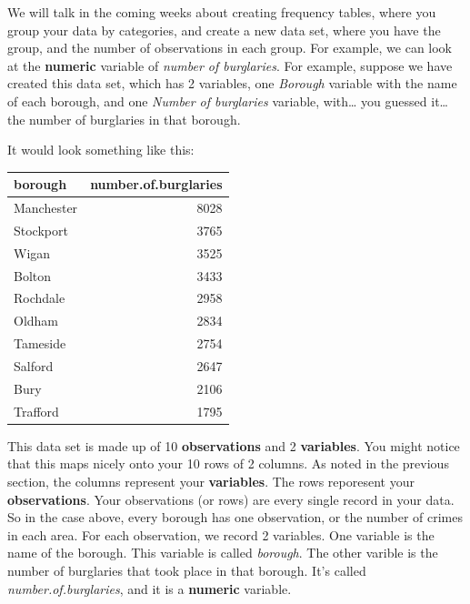 \documentclass[]{book}
\theoremstyle{definition}
\theoremstyle{definition}
\theoremstyle{definition}
\theoremstyle{remark}
\begin{document}
We will talk in the coming weeks about creating frequency tables, where
you group your data by categories, and create a new data set, where you
have the group, and the number of observations in each group. For
example, we can look at the \textbf{numeric} variable of \emph{number of
burglaries}. For example, suppose we have created this data set, which
has 2 variables, one \emph{Borough} variable with the name of each
borough, and one \emph{Number of burglaries} variable, with\ldots{} you
guessed it\ldots{} the number of burglaries in that borough.

It would look something like this:

\begin{tabular}{l|r}
\hline
borough & number.of.burglaries\\
\hline
Manchester & 8028\\
\hline
Stockport & 3765\\
\hline
Wigan & 3525\\
\hline
Bolton & 3433\\
\hline
Rochdale & 2958\\
\hline
Oldham & 2834\\
\hline
Tameside & 2754\\
\hline
Salford & 2647\\
\hline
Bury & 2106\\
\hline
Trafford & 1795\\
\hline
\end{tabular}

This data set is made up of 10 \textbf{observations} and 2
\textbf{variables}. You might notice that this maps nicely onto your 10
rows of 2 columns. As noted in the previous section, the columns
represent your \textbf{variables}. The rows reporesent your
\textbf{observations}. Your observations (or rows) are every single
record in your data. So in the case above, every borough has one
observation, or the number of crimes in each area. For each observation,
we record 2 variables. One variable is the name of the borough. This
variable is called \emph{borough}. The other varible is the number of
burglaries that took place in that borough. It's called
\emph{number.of.burglaries}, and it is a \textbf{numeric} variable.
\end{document}
